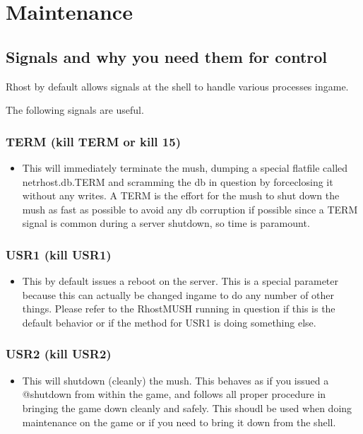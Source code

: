 \documentclass[letterpaper,10pt,english]{sphinxmanual}
\begin{document}
\section{Maintenance}
\label{\detokenize{maintenance:maintenance}}\label{\detokenize{maintenance::doc}}

\subsection{Signals and why you need them for control}
\label{\detokenize{maintenance:signals-and-why-you-need-them-for-control}}
\sphinxAtStartPar
Rhost by default allows signals at the shell to handle various processes in\sphinxhyphen{}game.

\sphinxAtStartPar
The following signals are useful.


\subsubsection{TERM (kill \sphinxhyphen{}TERM or kill \sphinxhyphen{}15)}
\label{\detokenize{maintenance:term-kill-term-or-kill-15}}\begin{itemize}
\item {} 
\sphinxAtStartPar
This will immediately terminate the mush, dumping a special flatfile called
netrhost.db.TERM and scramming the db in question by force\sphinxhyphen{}closing it
without any writes.  A TERM is the effort for the mush to shut down the
mush as fast as possible to avoid any db corruption if possible since
a TERM signal is common during a server shutdown, so time is paramount.

\end{itemize}


\subsubsection{USR1 (kill \sphinxhyphen{}USR1)}
\label{\detokenize{maintenance:usr1-kill-usr1}}\begin{itemize}
\item {} 
\sphinxAtStartPar
This by default issues a reboot on the server.  This is a special parameter
because this can actually be changed in\sphinxhyphen{}game to do any number of other
things.  Please refer to the RhostMUSH running in question if this is
the default behavior or if the method for USR1 is doing something else.

\end{itemize}


\subsubsection{USR2 (kill \sphinxhyphen{}USR2)}
\label{\detokenize{maintenance:usr2-kill-usr2}}\begin{itemize}
\item {} 
\sphinxAtStartPar
This will shutdown (cleanly) the mush.  This behaves as if you issued
a @shutdown from within the game, and follows all proper procedure
in bringing the game down cleanly and safely.  This shoudl be used
when doing maintenance on the game or if you need to bring it down
from the shell.

\end{itemize}
\end{document}
